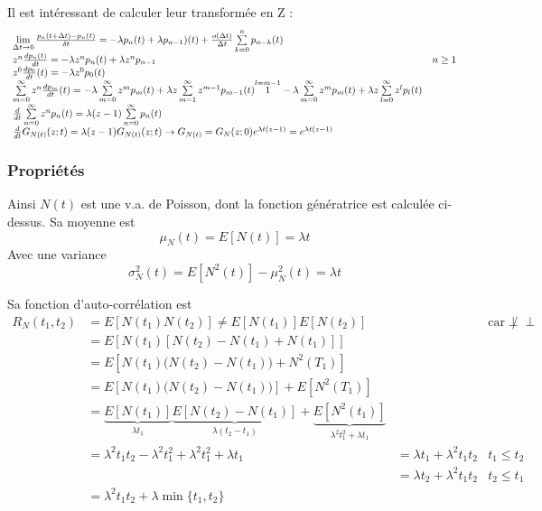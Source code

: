 \documentclass[11pt,a4paper]{article}
\newcommand{\indep}{\perp\!\!\!\perp}
\numberwithin{equation}{section}
\begin{document}
Il est intéressant de calculer leur transformée en Z : 
\[\begin{array}{ll}
    \limite{\Delta t \to 0}{\frac{p_n(t+ \Delta t) - p_n(t)}{\delta t}} = -\lambda p_n(t) + \lambda p_{n-1})(t) + \frac{o(\Delta t)}{\Delta t} \somme{n}{k=0} p_{n-k}(t)\\
    z^n \frac{d p_n(t)}{dt} = -\lambda z^n p_n(t) + \lambda z^n p_{n-1} & n \geq 1\\
    z^0 \frac{d p_0}{dt}(t) = -\lambda z^0 p_0(t)\\
    \somme{\infty}{m=0} z^n \frac{dp_m}{dt}(t) = -\lambda \somme{\infty}{m=0} z^m p_m(t) + \lambda z \somme{\infty}{m=1} z^{m-1}p_{m-1}(t) \overset{l=m-1}{1} -\lambda \somme{\infty}{m=0} z^m p_m(t) + \lambda z \somme{\infty}{l=0} z^{l}p_{l}(t)\\
    \frac{d}{dt}\somme{\infty}{n=0} z^n p_n(t) = \lambda(z-1) \somme{\infty}{n=0}p_n(t)\\
    \frac{d}{dt}G_{N(t)}(z;t) = \lambda(z-1) G_{N(t)}(z;t) \to G_{N(t)} = G_N(z;0) e^{\lambda t(z-1)} = e^{\lambda t(z-1)}
\end{array}\]
\subsubsection{Propriétés}
Ainsi $N(t)$ est une v.a. de Poisson, dont la fonction génératrice est calculée ci-dessus. Sa moyenne est 
\[\mu_N(t) = E[N(t)] = \lambda t\]
Avec une variance
\[\sigma_N^2(t) = E[N^2(t)] - \mu_N^2(t) = \lambda t\]

Sa fonction d'auto-corrélation est 
\[\begin{array}{llll}
    R_N(t_1,t_2) &= E[N(t_1)N(t_2)] \neq E[N(t_1)]E[N(t_2)] & & \text{car} \not\indep\\
    &= E[N(t_1) [N(t_2) - N(t_1) + N(t_1)]] \\
    &= E[N(t_1)\big(N(t_2)-N(t_1)\big) + N^2(T_1)]\\
    &= E[N(t_1)\big(N(t_2)-N(t_1)\big)] + E[N^2(T_1)]\\
    &=\underbrace{E[N(t_1)]}_{\lambda t_1} \underbrace{E[N(t_2) - N(t_1)]}_{\lambda(t_2-t_1)} + \underbrace{E[N^2(t_1)]}_{\lambda^2 t_1^2 + \lambda t_1}\\
    &=\lambda^2 t_1t_2 - \lambda^2 t_1^2 + \lambda^2 t_1^2 + \lambda t_1 & = \lambda t_1 + \lambda^2 t_1 t_2 & t_1 \leq t_2\\
    && =\lambda t_2 + \lambda^2 t_1 t_2 & t_2 \leq t_1\\
    &= \lambda^2 t_1 t_2 + \lambda \min\{t_1,t_2\}
\end{array}\]
\end{document}
